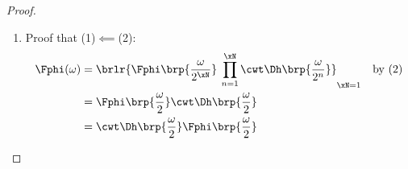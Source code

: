 \begin{proof}
\begin{enumerate}
\begin{enumerate}
      \item Proof that [$\xN$ case]$\implies$[$\xN+1$ case]:
        \begin{align*}
          \Fphi\brp{\frac{\omega}{2^{\xN+1}}}\:\prod_{n=1}^{\xN+1} \cwt \Dh\brp{\frac{\omega}{2^n}}
            &= \brs{\prod_{n=1}^{\xN} \cwt \Dh\brp{\frac{\omega}{2^n}}}
               \mcom{\cwt \Dh\brp{\frac{\omega}{2^{N+1}}}\Fphi\brp{\frac{\omega}{2^{\xN+1}}}}{$\Fphi(\omega/2^\xN)$}
          \\&= \Fphi(\omega/2^\xN) \prod_{n=1}^{\xN} \cwt \Dh\brp{\frac{\omega}{2^n}}
          \\&= \Fphi(\omega)
            && \text{by [$\xN$ case] hypothesis}
        \end{align*}
    \end{enumerate}

  \item Proof that (1)$\impliedby$(2):
    \begin{align*}
      \Fphi(\omega)
        &= \brlr{\Fphi\brp{\frac{\omega}{2^{\xN}}}\:\prod_{n=1}^{\xN} \cwt \Dh\brp{\frac{\omega}{2^n}}}_{\xN=1}
        && \text{by (2)}
      \\&= \Fphi\brp{\frac{\omega}{2}}\cwt \Dh\brp{\frac{\omega}{2}}
      \\&= \cwt\Dh\brp{\frac{\omega}{2}}\Fphi\brp{\frac{\omega}{2}}
    \end{align*}

\end{enumerate}
\end{proof}

